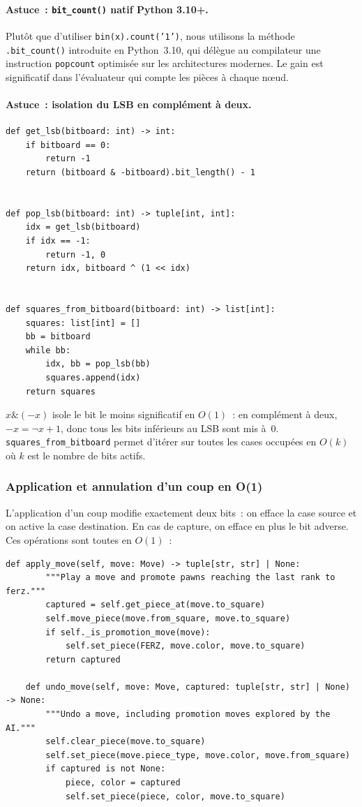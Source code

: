 \documentclass[a4paper,11pt]{article}
\begin{document}
\paragraph{Astuce~: \texttt{bit\_count()} natif Python 3.10+.}
Plutôt que d'utiliser \texttt{bin(x).count('1')}, nous utilisons la méthode
\texttt{.bit\_count()} introduite en Python~3.10, qui délègue au compilateur
une instruction \texttt{popcount} optimisée sur les architectures modernes.
Le gain est significatif dans l'évaluateur qui compte les pièces à chaque nœud.

\paragraph{Astuce~: isolation du LSB en complément à deux.}
\begin{verbatim}
def get_lsb(bitboard: int) -> int:
    if bitboard == 0:
        return -1
    return (bitboard & -bitboard).bit_length() - 1


def pop_lsb(bitboard: int) -> tuple[int, int]:
    idx = get_lsb(bitboard)
    if idx == -1:
        return -1, 0
    return idx, bitboard ^ (1 << idx)


def squares_from_bitboard(bitboard: int) -> list[int]:
    squares: list[int] = []
    bb = bitboard
    while bb:
        idx, bb = pop_lsb(bb)
        squares.append(idx)
    return squares
\end{verbatim}

$x \mathbin{\&} (-x)$ isole le bit le moins significatif en $O(1)$~: en
complément à deux, $-x = \lnot x + 1$, donc tous les bits inférieurs au
LSB sont mis à~0. \texttt{squares\_from\_bitboard} permet d'itérer sur toutes
les cases occupées en $O(k)$ où $k$ est le nombre de bits actifs.

\subsubsection{Application et annulation d'un coup en O(1)}

L'application d'un coup modifie exactement deux bits~: on efface la case source
et on active la case destination. En cas de capture, on efface en plus le bit
adverse. Ces opérations sont toutes en $O(1)$~:

\begin{verbatim}
def apply_move(self, move: Move) -> tuple[str, str] | None:
        """Play a move and promote pawns reaching the last rank to ferz."""
        captured = self.get_piece_at(move.to_square)
        self.move_piece(move.from_square, move.to_square)
        if self._is_promotion_move(move):
            self.set_piece(FERZ, move.color, move.to_square)
        return captured

    def undo_move(self, move: Move, captured: tuple[str, str] | None) -> None:
        """Undo a move, including promotion moves explored by the AI."""
        self.clear_piece(move.to_square)
        self.set_piece(move.piece_type, move.color, move.from_square)
        if captured is not None:
            piece, color = captured
            self.set_piece(piece, color, move.to_square)
\end{verbatim}
\end{document}
